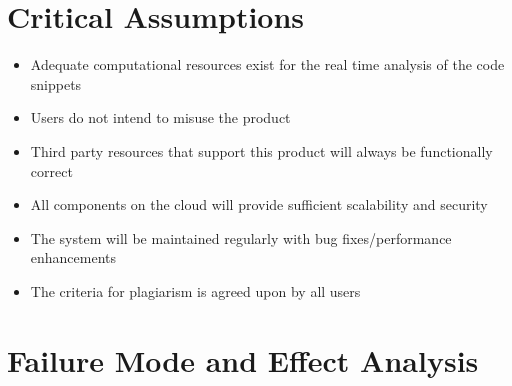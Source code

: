 \documentclass{article}
\begin{document}
\section{Critical Assumptions}
\begin{itemize}
    \item Adequate computational resources exist for the real time analysis of the code snippets
    \item Users do not intend to misuse the product
    \item Third party resources that support this product will always be functionally correct
    \item All components on the cloud will provide sufficient scalability and security
    \item The system will be maintained regularly with bug fixes/performance enhancements
    \item The criteria for plagiarism is agreed upon by all users
\end{itemize}

\section{Failure Mode and Effect Analysis}
\end{document}
